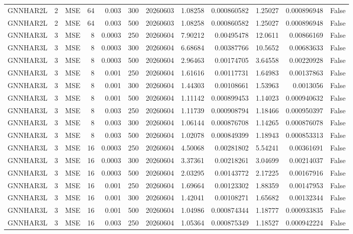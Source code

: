 \begin{tabular}{lrlrrrrrrrrr}
GNNHAR2L & 2 & MSE & 64 & 0.003 & 300 & 20260603 & 1.08258 & 0.000860582 & 1.25027 & 0.000896948 & False \\
GNNHAR2L & 2 & MSE & 64 & 0.003 & 500 & 20260603 & 1.08258 & 0.000860582 & 1.25027 & 0.000896948 & False \\
GNNHAR3L & 3 & MSE & 8 & 0.0003 & 250 & 20260604 & 7.90212 & 0.00495478 & 12.0611 & 0.00866169 & False \\
GNNHAR3L & 3 & MSE & 8 & 0.0003 & 300 & 20260604 & 6.68684 & 0.00387766 & 10.5652 & 0.00683633 & False \\
GNNHAR3L & 3 & MSE & 8 & 0.0003 & 500 & 20260604 & 2.96463 & 0.00174705 & 3.64558 & 0.00220928 & False \\
GNNHAR3L & 3 & MSE & 8 & 0.001 & 250 & 20260604 & 1.61616 & 0.00117731 & 1.64983 & 0.00137863 & False \\
GNNHAR3L & 3 & MSE & 8 & 0.001 & 300 & 20260604 & 1.44303 & 0.00108661 & 1.53963 & 0.0013056 & False \\
GNNHAR3L & 3 & MSE & 8 & 0.001 & 500 & 20260604 & 1.11142 & 0.000899453 & 1.14023 & 0.000940632 & False \\
GNNHAR3L & 3 & MSE & 8 & 0.003 & 250 & 20260604 & 1.11739 & 0.000908794 & 1.18466 & 0.000950397 & False \\
GNNHAR3L & 3 & MSE & 8 & 0.003 & 300 & 20260604 & 1.06144 & 0.000876708 & 1.14265 & 0.000876078 & False \\
GNNHAR3L & 3 & MSE & 8 & 0.003 & 500 & 20260604 & 1.02078 & 0.000849399 & 1.18943 & 0.000853313 & False \\
GNNHAR3L & 3 & MSE & 16 & 0.0003 & 250 & 20260604 & 4.50068 & 0.00281802 & 5.54241 & 0.00361691 & False \\
GNNHAR3L & 3 & MSE & 16 & 0.0003 & 300 & 20260604 & 3.37361 & 0.00218261 & 3.04699 & 0.00214037 & False \\
GNNHAR3L & 3 & MSE & 16 & 0.0003 & 500 & 20260604 & 2.03295 & 0.00143772 & 2.17225 & 0.00167916 & False \\
GNNHAR3L & 3 & MSE & 16 & 0.001 & 250 & 20260604 & 1.69664 & 0.00123302 & 1.88359 & 0.00147953 & False \\
GNNHAR3L & 3 & MSE & 16 & 0.001 & 300 & 20260604 & 1.42041 & 0.00108271 & 1.65682 & 0.00132344 & False \\
GNNHAR3L & 3 & MSE & 16 & 0.001 & 500 & 20260604 & 1.04986 & 0.000874344 & 1.18777 & 0.000933835 & False \\
GNNHAR3L & 3 & MSE & 16 & 0.003 & 250 & 20260604 & 1.05364 & 0.000875349 & 1.18527 & 0.000942224 & False \\

\end{tabular}
